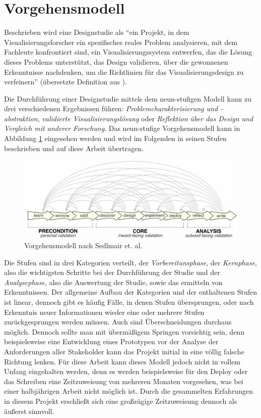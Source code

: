 \documentclass[
  ngerman,
  a4paper,  %
  twoside,  %
  bibliography=totoc,
  headsepline,
  cleardoublepage=empty,
  parskip=half,
  draft=false
]{scrbook}
\begin{document}
\section{Vorgehensmodell}

Beschrieben wird eine Designstudie als \enquote{ein Projekt, in dem Visualisierungsforscher ein spezifisches reales Problem analysieren, mit dem Fachleute konfrontiert sind, ein Visualisierungssystem entwerfen, das die Lösung dieses Problems unterstützt, das Design validieren, über die gewonnenen Erkenntnisse nachdenken, um die Richtlinien für das Visualisierungsdesign zu verfeinern} (übersetzte Definition aus \cite{sedlmair_design_2012}).

Die Durchführung einer Designstudie mittels dem neun-stufigen Modell kann zu drei verschiedenen Ergebnissen führen: \textit{Problemcharakterisierung und -abstraktion}, \textit{validierte Visualisierungslösung} oder \textit{Reflektion über das Design und Vergleich mit anderer Forschung}. Das neun-stufige Vorgehensmodell kann in Abbildung \ref{fig:vorgehensmodell} eingesehen werden und wird im Folgenden in seinen Stufen beschrieben und auf diese Arbeit übertragen.

\begin{figure}
  \includegraphics[width=\textwidth]{graphics/vorgehensmodell.png}
  \caption{Vorgehensmodell nach Sedlmair et. al. \cite{sedlmair_design_2012}}
  \label{fig:vorgehensmodell}
\end{figure}

Die Stufen sind in drei Kategorien verteilt, der \textit{Vorbereitunsphase}, der \textit{Kernphase}, also die wichtigsten Schritte bei der Durchführung der Studie und der \textit{Analysephase}, also die Auswertung der Studie, sowie das ermitteln von Erkenntnissen. Der allgemeine Aufbau der Kategorien und der enthaltenen Stufen ist linear, dennoch gibt es häufig Fälle, in denen Stufen übersprungen, oder nach Erkenntnis neuer Informationen wieder eine oder mehrere Stufen zurückgesprungen werden müssen. Auch sind Überschneidungen durchaus möglich. Dennoch sollte man mit übermäßigem Springen vorsichtig sein, denn beispielsweise eine Entwicklung eines Prototypen vor der Analyse der Anforderungen aller Stakeholder kann das Projekt initial in eine völlig falsche Richtung lenken. Für diese Arbeit kann dieses Modell jedoch nicht in vollem Unfang eingehalten werden, denn es werden beispielsweise für den Deploy oder das Schreiben eine Zeitzuweisung von mehreren Monaten vorgesehen, was bei einer halbjährigen Arbeit nicht möglich ist. Durch die gesammelten Erfahrungen in diesem Projekt erschließt sich eine großzügige Zeitzuweisung dennoch als äußerst sinnvoll.
\end{document}
